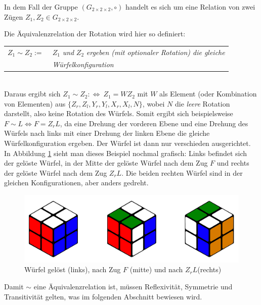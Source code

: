 \documentclass[12pt,a4paper, usenames, dvipsnames]{article}
\theoremstyle{mystyle}
\theoremstyle{definition}
\newcommand{\Gtwo}{\ensuremath{G_{2\times 2\times 2}}}
\begin{document}
In dem Fall der Gruppe $(\Gtwo, \circ)$ handelt es sich um eine Relation von zwei Zügen $Z_1, Z_2 \in \Gtwo$. 

Die Äquivalenzrelation der Rotation wird hier so definiert: 


\begin{tabular}{l l}
$Z_1 \sim Z_2 := \ $  & $Z_1$ \textit{und} $Z_2$ \textit{ergeben (mit optionaler Rotation) die gleiche }\\
\  & \textit{Würfelkonfiguration} \\
\end{tabular} 
\\

Daraus ergibt sich $Z_1 \sim Z_2 :\Leftrightarrow \ Z_1 = WZ_2$ mit $W$ als Element (oder Kombination von Elementen) aus $\{{Z_r}, {Z_l}, {Y_r}, {Y_l}, {X_r}, {X_l}, N\}$, wobei $N$ die \textit{leere} Rotation darstellt, also keine Rotation des Würfels. 
Somit ergibt sich beispielsweise $F \sim L \Leftrightarrow F = Z_rL$, da eine Drehung der vorderen Ebene und eine Drehung des Würfels nach links mit einer Drehung der linken Ebene die gleiche Würfelkonfiguration ergeben. Der Würfel ist dann nur verschieden ausgerichtet. 
In Abbildung \ref{1} sieht man dieses Beispiel nochmal grafisch: Links befindet sich der gelöste Würfel, in der Mitte der gelöste Würfel nach dem Zug $F$ und rechts der gelöste Würfel nach dem Zug $Z_rL$. Die beiden rechten Würfel sind in der gleichen Konfigurationen, aber anders gedreht.
\begin{figure}[h]
\centering
\includegraphics[scale=0.15]{3_wuerfel.png}
\caption[Würfel gelöst, nach Zug $F$ und nach $Z_rL$]{Würfel gelöst (links), nach Zug $F$ (mitte) und nach $Z_rL$(rechts)}
\label{1}
\end{figure}

Damit $\sim$ eine Äquivalenzrelation ist, müssen Reflexivität, Symmetrie und Transitivität gelten, was im folgenden Abschnitt bewiesen wird.
\end{document}
